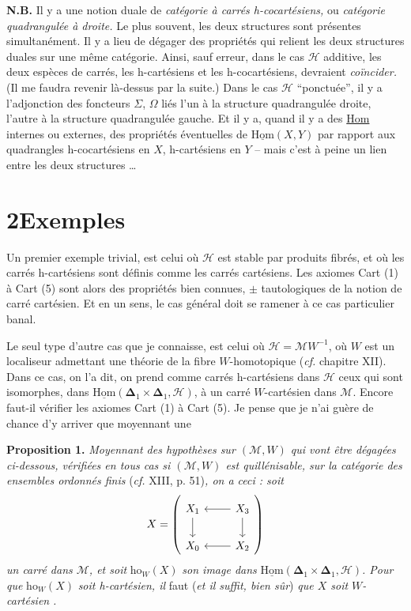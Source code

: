 \documentclass[11pt]{article}
\newcommand{\printedpage}[1]{\marginpar{\footnotesize p.~#1}}
\newcommand{\msp}[1]{\marginpar{\footnotesize [#1]}}
\newcommand{\uHom}{\underline{\mathrm{Hom}}}
\newcommand{\bDelta}{\mathbf{\Delta}}
\newcommand{\ho}{\mathrm{ho}}
\begin{document}
\printedpage{6}

\msp{page 7}
\textbf{N.B.} Il y a une notion duale de \textit{catégorie à carrés h-cocartésiens,} ou \textit{catégorie quadrangulée à droite.} Le plus souvent, les deux structures sont présentes simultanément. Il y a lieu de dégager des propriétés qui relient les deux structures duales sur une même catégorie. Ainsi, sauf erreur, dans le cas $\mathcal{H}$ additive, les deux espèces de carrés, les h-cartésiens et les h-cocartésiens, devraient \textit{coïncider.} (Il me faudra revenir là-dessus par la suite.) Dans le cas $\mathcal{H}$ ``ponctuée'', il y a l'adjonction des foncteurs $\Sigma$, $\Omega$ liés l'un à la structure quadrangulée droite, l'autre à la structure quadrangulée gauche. Et il y a, quand il y a des \underline{Hom} internes ou externes, des propriétés éventuelles de $\uHom(X,Y)$ par rapport aux quadrangles h-cocartésiens en $X$, h-cartésiens en $Y$ -- mais c'est à peine un lien entre les deux structures \ldots

\section*{2\quad Exemples}

Un premier exemple trivial, est celui où $\mathcal{H}$ est stable par produits fibrés, et où les carrés h-cartésiens sont définis comme les carrés cartésiens. Les axiomes Cart (1) à Cart (5) sont alors des propriétés bien connues, $\pm$ tautologiques de la notion de carré cartésien. Et
\msp{page 8}
en un sens, le cas général doit se ramener à ce cas particulier banal.

Le seul type d'autre cas que je connaisse, est celui où $\mathcal{H} = \mathcal{M}W^{-1}$, où $W$ est un localiseur admettant une théorie de la fibre $W$-homotopique (\textit{cf.} chapitre XII). Dans ce cas, on l'a dit, on prend comme carrés h-cartésiens dans $\mathcal{H}$ ceux qui sont isomorphes, dans $\uHom(\bDelta_1 \times \bDelta_1, \mathcal{H})$, à un carré $W$-cartésien dans $\mathcal{M}$. Encore faut-il vérifier les axiomes Cart (1) à Cart (5). Je pense que je n'ai guère de chance d'y arriver que moyennant une

\textbf{Proposition 1.} \textit{Moyennant des hypothèses sur $(\mathcal{M}, W)$ qui vont être dégagées ci-dessous, vérifiées en tous cas si $(\mathcal{M}, W)$ est quillénisable, sur la catégorie des ensembles ordonnés finis} (\textit{cf.} XIII, p. 51)\textit{, on a ceci : soit}
\[
X = \left(\begin{tikzcd}
X_1 \ar[d] & X_3 \ar[l] \ar[d] \\
X_0 & X_2 \ar[l]
\end{tikzcd}\right)
\]
\textit{un carré dans $\mathcal{M}$, et soit} $\ho_W(X)$ \textit{son image dans} $\uHom(\bDelta_1 \times \bDelta_1, \mathcal{H})$\textit{. Pour que} $\ho_W(X)$ \textit{soit h-cartésien, il} faut (\textit{et il suffit, bien sûr}) \textit{que $X$ soit $W$-cartésien} \textit{.}

\printedpage{7}

\end{document}

